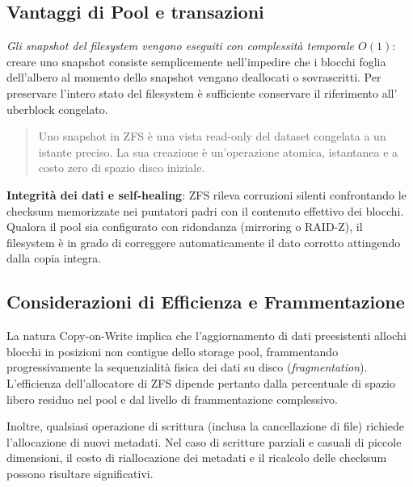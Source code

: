 \subsection{Vantaggi di Pool e
transazioni}\label{vantaggi-di-pool-e-transazioni}

\emph{Gli snapshot del filesystem vengono eseguiti con complessità
temporale \(O(1)\)}: creare uno snapshot consiste semplicemente
nell'impedire che i blocchi foglia dell'albero al momento dello snapshot
vengano deallocati o sovrascritti. Per preservare l'intero stato del
filesystem è sufficiente conservare il riferimento
all'\(\text{uberblock}\) congelato.

\begin{quote}
Uno snapshot in ZFS è una vista read-only del dataset congelata a un
istante preciso. La sua creazione è un'operazione atomica, istantanea e
a costo zero di spazio disco iniziale.
\end{quote}

\textbf{Integrità dei dati e self-healing}: ZFS rileva corruzioni
silenti confrontando le checksum memorizzate nei puntatori padri con il
contenuto effettivo dei blocchi. Qualora il pool sia configurato con
ridondanza (mirroring o RAID-Z), il filesystem è in grado di correggere
automaticamente il dato corrotto attingendo dalla copia integra.

\subsection{Considerazioni di Efficienza e
Frammentazione}\label{considerazioni-di-efficienza-e-frammentazione}

La natura Copy-on-Write implica che l'aggiornamento di dati preesistenti
allochi blocchi in posizioni non contigue dello storage pool,
frammentando progressivamente la sequenzialità fisica dei dati su disco
(\emph{fragmentation}). L'efficienza dell'allocatore di ZFS dipende
pertanto dalla percentuale di spazio libero residuo nel pool e dal
livello di frammentazione complessivo.

Inoltre, qualsiasi operazione di scrittura (inclusa la cancellazione di
file) richiede l'allocazione di nuovi metadati. Nel caso di scritture
parziali e casuali di piccole dimensioni, il costo di riallocazione dei
metadati e il ricalcolo delle checksum possono risultare significativi.
